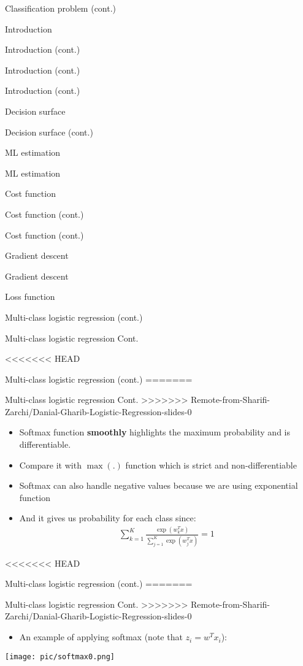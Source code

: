 \documentclass[serif, aspectratio=169]{beamer}
\begin{document}
\begin{frame}{Classification problem (cont.)}
\begin{itemize}
\begin{frame}{Introduction}
\begin{itemize}
\begin{frame}{Introduction (cont.)}
\begin{frame}{Introduction (cont.)}
\begin{frame}{Introduction (cont.)}
\begin{frame}{Decision surface}
\begin{itemize}
\begin{frame}{Decision surface (cont.)}
\begin{frame}{ML estimation}
\begin{frame}{ML estimation}
\begin{itemize}
\begin{frame}{Cost function}
\begin{frame}{Cost function (cont.)}
\begin{itemize}
\begin{itemize}
\begin{frame}{Cost function (cont.)}
\begin{frame}{Gradient descent}
\begin{frame}{Gradient descent}
\begin{frame}{Loss function}
\begin{frame}{Multi-class logistic regression (cont.)}
\begin{frame}{Multi-class logistic regression Cont.}
\begin{itemize}
    \end{itemize}
\end{frame}
<<<<<<< HEAD
\begin{frame}{Multi-class logistic regression (cont.)}
=======
\begin{frame}{Multi-class logistic regression Cont.}
>>>>>>> Remote-from-Sharifi-Zarchi/Danial-Gharib-Logistic-Regression-slides-0
    \begin{itemize}
        \item Softmax function \textbf{smoothly} highlights the maximum probability and is differentiable.
        \item Compare it with $\max (.)$ function which is strict and non-differentiable
        \item Softmax can also handle negative values because we are using exponential function
        \item And it gives us probability for each class since:
            \begin{align*}
                \displaystyle \sum _{k=1}^{K} \frac{\exp (w_k^Tx)}{\sum _{j=1}^{K} \exp (w_j^Tx) } = 1
            \end{align*}
    \end{itemize}
\end{frame}

<<<<<<< HEAD
\begin{frame}{Multi-class logistic regression (cont.)}
=======
\begin{frame}{Multi-class logistic regression Cont.}
>>>>>>> Remote-from-Sharifi-Zarchi/Danial-Gharib-Logistic-Regression-slides-0
    \begin{itemize}
        \item An example of applying softmax (note that $z_i=w^Tx_i$):
    \end{itemize}
    \begin{center}
        \texttt{[image: pic/softmax0.png]}
       
    \end{center}
\end{frame}


\end{frame}
\end{frame}
\end{frame}
\end{frame}
\end{frame}
\end{frame}
\end{frame}
\end{itemize}
\end{itemize}
\end{frame}
\end{frame}
\end{itemize}
\end{frame}
\end{frame}
\end{frame}
\end{itemize}
\end{frame}
\end{frame}
\end{frame}
\end{frame}
\end{itemize}
\end{frame}
\end{itemize}
\end{frame}
\end{document}
